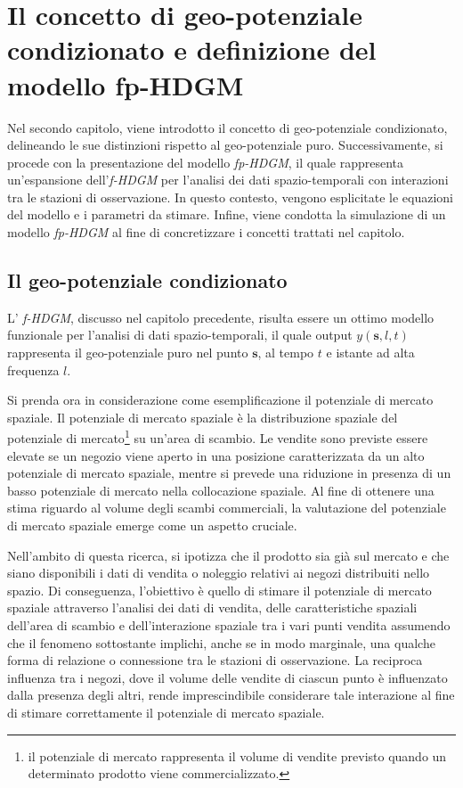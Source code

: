 \chapter[Il concetto di geo-potenziale condizionato e il modello fp-HDGM]{Il concetto di geo-potenziale condizionato e definizione del modello fp-HDGM}
Nel secondo capitolo, viene introdotto il concetto di geo-potenziale condizionato, delineando le sue distinzioni rispetto al geo-potenziale puro. Successivamente, si procede con la presentazione del modello \textit{fp-HDGM}, il quale rappresenta un'espansione dell'\textit{f-HDGM} per l'analisi dei dati spazio-temporali con interazioni tra le stazioni di osservazione. In questo contesto, vengono esplicitate le equazioni del modello e i parametri da stimare. Infine, viene condotta la simulazione di un modello \textit{fp-HDGM} al fine di concretizzare i concetti trattati nel capitolo.
\section[Il geo-potenziale condizionato]{Il geo-potenziale condizionato}
L' \textit{f-HDGM}, discusso nel capitolo precedente, risulta essere un ottimo modello funzionale per l'analisi di dati spazio-temporali, il quale output $y(\mathbf{s}, l, t)$ rappresenta il geo-potenziale puro nel punto $\mathbf{s}$, al tempo $t$ e istante ad alta frequenza $l$.
\par Si prenda ora in considerazione come esemplificazione il potenziale di mercato spaziale. Il potenziale di mercato spaziale è la distribuzione spaziale del potenziale di mercato\footnote{il potenziale di mercato rappresenta il volume di vendite previsto quando un determinato prodotto viene commercializzato.} su un'area di scambio.
Le vendite sono previste essere elevate se un negozio viene aperto in una posizione caratterizzata da un alto potenziale di mercato spaziale, mentre si prevede una riduzione in presenza di un basso potenziale di mercato nella collocazione spaziale.
Al fine di ottenere una stima riguardo al volume degli scambi commerciali, la valutazione del potenziale di mercato spaziale emerge come un aspetto cruciale.
\par Nell'ambito di questa ricerca, si ipotizza che il prodotto sia già sul mercato e che siano disponibili i dati di vendita o noleggio relativi ai negozi distribuiti nello spazio. Di conseguenza, l'obiettivo è quello di stimare il potenziale di mercato spaziale attraverso l'analisi dei dati di vendita, delle caratteristiche spaziali dell'area di scambio e dell'interazione spaziale tra i vari punti vendita assumendo che il fenomeno sottostante implichi, anche se in modo marginale, una qualche forma di relazione o connessione tra le stazioni di osservazione. La reciproca influenza tra i negozi, dove il volume delle vendite di ciascun punto è influenzato dalla presenza degli altri, rende imprescindibile considerare tale interazione al fine di stimare correttamente il potenziale di mercato spaziale.

